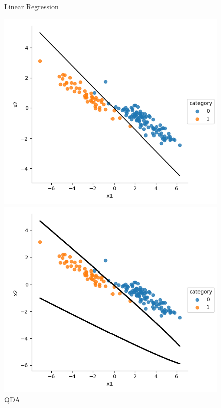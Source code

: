 \documentclass[a4paper]{article}
\begin{document}
\begin{figure}[h]
\begin{minipage}{0,45\textwidth}
\end{minipage}
\begin{minipage}{0,45\textwidth}
\caption{Linear Regression}
\includegraphics[scale=.5]{a_lr.png}
\end{minipage}
\begin{minipage}{0,45\textwidth}
\caption{QDA}
\includegraphics[scale=.5]{a_qda.png}
\end{minipage}
\end{figure}
\end{document}
